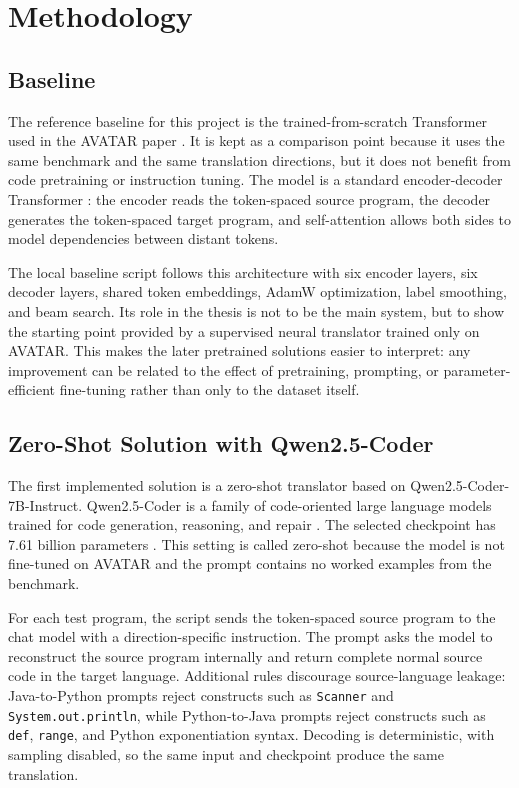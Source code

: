 \chapter{Methodology}

\section{Baseline}

\quad The reference baseline for this project is the trained-from-scratch
Transformer used in the AVATAR paper \cite{ahmad2023avatar}. It is kept as a
comparison point because it uses the same benchmark and the same translation
directions, but it does not benefit from code pretraining or instruction
tuning. The model is a standard encoder-decoder Transformer
\cite{vaswani2017transformer}: the encoder reads the token-spaced source
program, the decoder generates the token-spaced target program, and
self-attention allows both sides to model dependencies between distant tokens.

The local baseline script follows this architecture with six encoder layers,
six decoder layers, shared token embeddings, AdamW optimization, label
smoothing, and beam search. Its role in the thesis is not to be the main
system, but to show the starting point provided by a supervised neural
translator trained only on AVATAR. This makes the later pretrained solutions
easier to interpret: any improvement can be related to the effect of
pretraining, prompting, or parameter-efficient fine-tuning rather than only to
the dataset itself.

\section{Zero-Shot Solution with Qwen2.5-Coder}
\label{sec:zero-shot-qwen}

\quad The first implemented solution is a zero-shot translator based on
Qwen2.5-Coder-7B-Instruct. Qwen2.5-Coder is a family of code-oriented large
language models trained for code generation, reasoning, and repair
\cite{hui2024qwen25coder}. The selected checkpoint has 7.61 billion
parameters \cite{qwen2024qwen25coder7b}. This setting is called zero-shot
because the model is not fine-tuned on AVATAR and the prompt contains no
worked examples from the benchmark.

For each test program, the script sends the token-spaced source program to the
chat model with a direction-specific instruction. The prompt asks the model to
reconstruct the source program internally and return complete normal source
code in the target language. Additional rules discourage source-language
leakage: Java-to-Python prompts reject constructs such as \texttt{Scanner} and
\texttt{System.out.println}, while Python-to-Java prompts reject constructs
such as \texttt{def}, \texttt{range}, and Python exponentiation syntax.
Decoding is deterministic, with sampling disabled, so the same input and
checkpoint produce the same translation.

